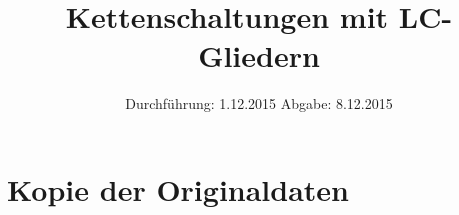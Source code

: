 

\subject{V 356}
\title{Kettenschaltungen mit LC-Gliedern}
\date{
  Durchführung: 1.12.2015
  \hspace{3em}
  Abgabe: 8.12.2015
}



\maketitle
\thispagestyle{empty}
\tableofcontents
\newpage






\newpage

\printbibliography

\appendix
\section{Kopie der Originaldaten}


